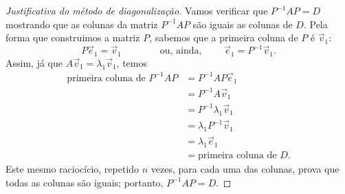 \documentclass[../livro.tex]{subfiles}  %
\begin{document}
\begin{proof}[Justificativa do método de diagonalização]
Vamos verificar que $P^{-1} A P = D$ mostrando que as colunas da matriz $P^{-1} A P$ são iguais as colunas de $D$. Pela forma que construimos a matriz $P$, sabemos que a primeira coluna de $P$ é $\vec{v}_1$: 
\begin{equation}
P \vec{e}_1 = \vec{v}_1 \qquad \qquad \text{ou, ainda, } \qquad  \vec{e}_1 = P^{-1} \vec{v}_1.
\end{equation} Assim, já que $A \vec{v}_1 = \lambda_1 \vec{v}_1$, temos
\begin{equation}
\begin{split}
\text{primeira coluna de } P^{-1} A P  & = P^{-1} A P \vec{e}_1 \\
                                       & = P^{-1} A \vec{v}_1 \\
                                       & = P^{-1} \lambda_1 \vec{v}_1 \\
                                       & = \lambda_1 P^{-1} \vec{v}_1 \\
                                       & = \lambda_1 \vec{e}_1 \\
                                       & = \text{primeira coluna de } D.
\end{split}
\end{equation}
Este mesmo raciocício, repetido $n$ vezes, para cada uma das colunas, prova que todas as colunas são iguais; portanto, $P^{-1} A P = D$.
\end{proof}
\end{document}
